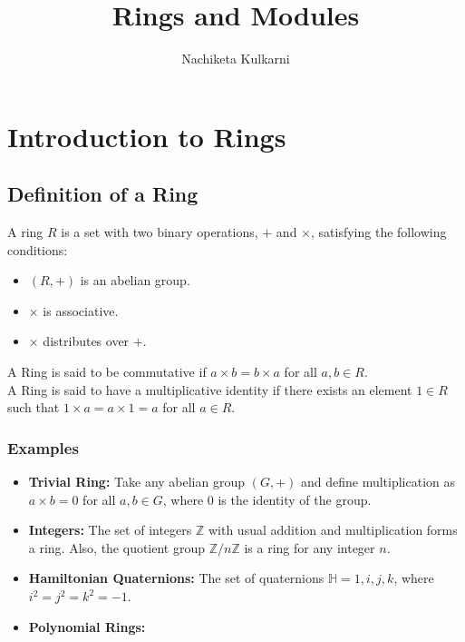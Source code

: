\documentclass[12pt, oneside]{book}
\date{}
\title{Rings and Modules}
\author{Nachiketa Kulkarni}
\begin{document}
\maketitle
\tableofcontents

\mainmatter
\chapter{Introduction to Rings}
\section{Definition of a Ring}
A ring \(R\) is a set with two binary operations, \(+\) and \(\times\), satisfying the following conditions:
\begin{itemize}
    \item \(\left(R,+\right)\) is an abelian group.
    \item \(\times\) is associative.
    \item \(\times\) distributes over \(+\).
\end{itemize}
A Ring is said to be commutative if \(a \times b = b \times a\) for all \(a, b \in R\).\\
A Ring is said to have a multiplicative identity if there exists an element \(1 \in R\) such that \(1 \times a = a \times 1 = a\) for all \(a \in R\).\\

\subsection{Examples}
\begin{itemize}
    \item \textbf{Trivial Ring:} Take any abelian group \((G,+)\) and define multiplication as \(a \times b = 0\) for all \(a, b \in G\), where \(0\) is the identity of the group.
    \item \textbf{Integers:} The set of integers \(\mathbb{Z}\) with usual addition and multiplication forms a ring.
    Also, the quotient group \(\mathbb{Z}/n\mathbb{Z}\) is a ring for any integer \(n\).
    \item \textbf{Hamiltonian Quaternions:} The set of quaternions \(\mathbb{H} = {1, i, j, k}\), where \(i^2 = j^2 = k^2 = -1\).
    \item \textbf{Polynomial Rings:} 
\end{itemize}
\end{document}

